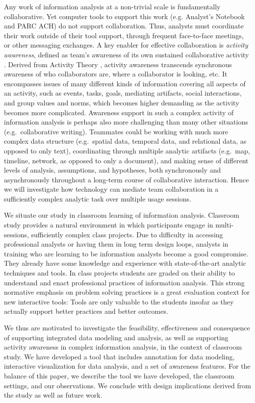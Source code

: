Any work of information analysis at a non-trivial scale is fundamentally
collaborative. Yet computer tools to support this work (e.g. Analyst's Notebook
and PARC ACH) do not support collaboration. Thus, analysts must coordinate their
work outside of their tool support, through frequent face-to-face meetings, or
other messaging exchanges. A key enabler for effective collaboration is
\emph{activity awareness}, defined as team's awareness of its own sustained
collaborative activity \autocite{Carroll2006}. Derived from Activity Theory \autocite{Leontev1974},
activity awareness transcends synchronous awareness of who collaborators are,
where a collaborator is looking, etc. It encompasses issues of many different
kinds of information covering all aspects of an activity, such as events, tasks,
goals, mediating artifacts, social interactions, and group values and norms,
which becomes higher demanding as the activity becomes more complicated.
Awareness support in such a complex activity of information analysis is perhaps
also more challenging than many other situations (e.g.~collaborative writing).
Teammates could be working with much more complex data structure (e.g.~spatial
data, temporal data, and relational data, as opposed to only text), coordinating
through multiple analytic artifacts (e.g.~map, timeline, network, as opposed to
only a document), and making sense of different levels of analysis, assumptions,
and hypotheses, both synchronously and asynchronously throughout a long-term
course of collaborative interaction. Hence we will investigate how technology
can mediate team collaboration in a sufficiently complex analytic task over
multiple usage sessions.

We situate our study in classroom learning of information analysis.
Classroom study provides a natural environment in which participants
engage in multi-sessions, sufficiently complex class projects. Due to difficulty in
accessing professional analysts or having them in long term design
loops, analysts in training who are learning to be information analysts
become a good compromise. They already have some knowledge and
experience with state-of-the-art analytic techniques and tools. In class
projects students are graded on their ability to understand and enact
professional practices of information analysis. This strong normative
emphasis on problem solving practices is a great evaluation context for
new interactive tools: Tools are only valuable to the students insofar
as they actually support better practices and better outcomes.

We thus are motivated to investigate the feasibility, effectiveness and
consequence of supporting integrated data modeling and analysis, as well
as supporting activity awareness in complex information analysis, in the
context of classroom study. We have developed a tool that includes
annotation for data modeling, interactive visualization for data
analysis, and a set of awareness features. For the balance of this
paper, we describe the tool we have developed, the classroom settings,
and our observations. We conclude with design implications derived from
the study as well as future work.
